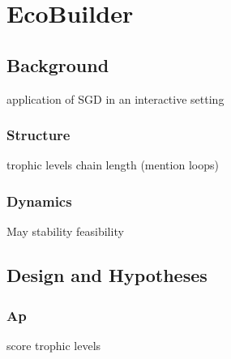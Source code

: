\chapter{EcoBuilder}

\section{Background}
application of SGD in an interactive setting

\subsection{Structure}
trophic levels
chain length
(mention loops)
\subsection{Dynamics}
May stability
feasibility

\section{Design and Hypotheses}
\subsection{Ap}
score
trophic levels

